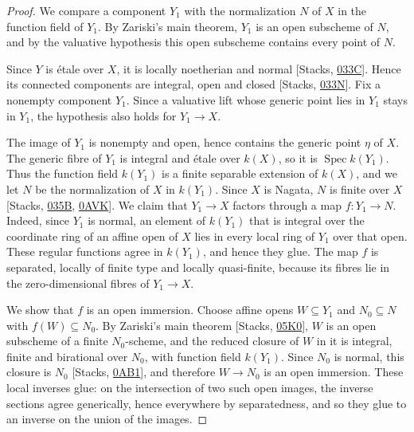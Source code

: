 \documentclass[11pt]{article}
\begin{document}
\begin{proof}[{Proof}]\label{bp29}%
We compare a component \(Y_1\) with the normalization \(N\) of \(X\) in the function field of \(Y_1\). By Zariski's main theorem, \(Y_1\) is an open subscheme of \(N\), and by the valuative hypothesis this open subscheme contains every point of \(N\).

Since \(Y\) is étale over \(X\), it is locally noetherian and normal [Stacks, \href{https://stacks.math.columbia.edu/tag/033C}{033C}]. Hence its connected components are integral, open and closed [Stacks, \href{https://stacks.math.columbia.edu/tag/033N}{033N}]. Fix a nonempty component \(Y_1\). Since a valuative lift whose generic point lies in \(Y_1\) stays in \(Y_1\), the hypothesis also holds for \(Y_1\to X\).

The image of \(Y_1\) is nonempty and open, hence contains the generic point \(\eta\) of \(X\). The generic fibre of \(Y_1\) is integral and étale over \(k(X)\), so it is \(\operatorname{Spec}k(Y_1)\). Thus the function field \(k(Y_1)\) is a finite separable extension of \(k(X)\), and we let \(N\) be the normalization of \(X\) in \(k(Y_1)\). Since \(X\) is Nagata, \(N\) is finite over \(X\) [Stacks, \href{https://stacks.math.columbia.edu/tag/035B}{035B}, \href{https://stacks.math.columbia.edu/tag/0AVK}{0AVK}]. We claim that \(Y_1\to X\) factors through a map \(f:Y_1\to N\). Indeed, since \(Y_1\) is normal, an element of \(k(Y_1)\) that is integral over the coordinate ring of an affine open of \(X\) lies in every local ring of \(Y_1\) over that open. These regular functions agree in \(k(Y_1)\), and hence they glue. The map \(f\) is separated, locally of finite type and locally quasi-finite, because its fibres lie in the zero-dimensional fibres of \(Y_1\to X\).

We show that \(f\) is an open immersion. Choose affine opens \(W\subseteq Y_1\) and \(N_0\subseteq N\) with \(f(W)\subseteq N_0\). By Zariski's main theorem [Stacks, \href{https://stacks.math.columbia.edu/tag/05K0}{05K0}], \(W\) is an open subscheme of a finite \(N_0\)-scheme, and the reduced closure of \(W\) in it is integral, finite and birational over \(N_0\), with function field \(k(Y_1)\). Since \(N_0\) is normal, this closure is \(N_0\) [Stacks, \href{https://stacks.math.columbia.edu/tag/0AB1}{0AB1}], and therefore \(W\to N_0\) is an open immersion. These local inverses glue: on the intersection of two such open images, the inverse sections agree generically, hence everywhere by separatedness, and so they glue to an inverse on the union of the images.


\end{proof}
\end{document}
